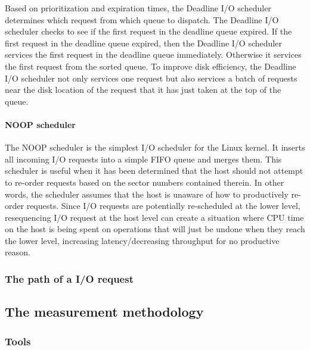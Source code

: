 \documentclass{acmsig}
\begin{document}
    Based on prioritization and expiration times, the Deadline I/O scheduler determines which request from which queue to dispatch. The Deadline I/O scheduler checks to see if the first request in the deadline queue expired. If the first request in the deadline queue expired, then the Deadline I/O scheduler services the first request in the deadline queue immediately. Otherwise it services the first request from the sorted queue. To improve disk efficiency, the Deadline I/O scheduler not only services one request but also services a batch of requests near the disk location of the request that it has just taken at the top of the queue.

    \paragraph{NOOP scheduler}
    The NOOP scheduler is the simplest I/O scheduler for the Linux kernel. It inserts all incoming I/O requests into a simple FIFO queue and merges them. This scheduler is useful when it has been determined that the host should not attempt to re-order requests based on the sector numbers contained therein. In other words, the scheduler assumes that the host is unaware of how to productively re-order requests. Since I/O requests are potentially re-scheduled at the lower level, resequencing I/O request at the host level can create a situation where CPU time on the host is being spent on operations that will just be undone when they reach the lower level, increasing latency/decreasing throughput for no productive reason.

  \subsubsection{The path of a I/O request}

\subsection{The measurement methodology}

\subsubsection{Tools}
\end{document}
